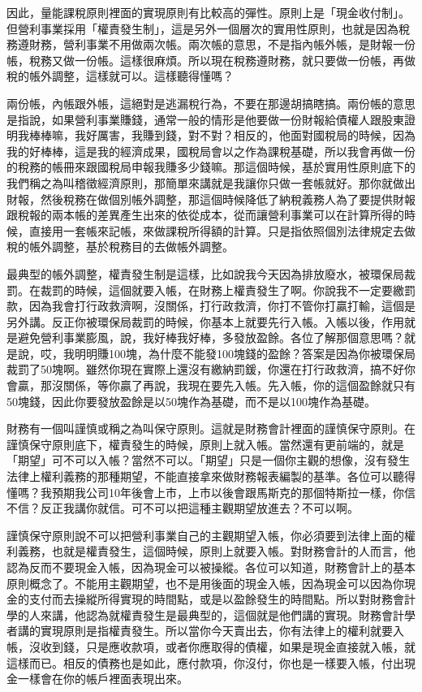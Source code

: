 \documentclass[oneside,sub3section]{ctexbook}
\begin{document}
因此，量能課稅原則裡面的實現原則有比較高的彈性。原則上是「現金收付制」。但營利事業採用「權責發生制」，這是另外一個層次的實用性原則，也就是因為稅務遵財務，營利事業不用做兩次帳。兩次帳的意思，不是指內帳外帳，是財報一份帳，稅務又做一份帳。這樣很麻煩。所以現在稅務遵財務，就只要做一份帳，再做稅的帳外調整，這樣就可以。這樣聽得懂嗎？

兩份帳，內帳跟外帳，這絕對是逃漏稅行為，不要在那邊胡搞瞎搞。兩份帳的意思是指說，如果營利事業賺錢，通常一般的情形是他要做一份財報給債權人跟股東證明我棒棒嘛，我好厲害，我賺到錢，對不對？相反的，他面對國稅局的時候，因為我的好棒棒，這是我的經濟成果，國稅局會以之作為課稅基礎，所以我會再做一份的稅務的帳冊來跟國稅局申報我賺多少錢嘛。那這個時候，基於實用性原則底下的我們稱之為叫稽徵經濟原則，那簡單來講就是我讓你只做一套帳就好。那你就做出財報，然後稅務在做個別帳外調整，那這個時候降低了納稅義務人為了要提供財報跟稅報的兩本帳的差異產生出來的依從成本，從而讓營利事業可以在計算所得的時候，直接用一套帳來記帳，來做課稅所得額的計算。只是指依照個別法律規定去做稅的帳外調整，基於稅務目的去做帳外調整。

最典型的帳外調整，權責發生制是這樣，比如說我今天因為排放廢水，被環保局裁罰。在裁罰的時候，這個就要入帳，在財務上權責發生了啊。你說我不一定要繳罰款，因為我會打行政救濟啊，沒關係，打行政救濟，你打不管你打贏打輸，這個是另外講。反正你被環保局裁罰的時候，你基本上就要先行入帳。入帳以後，作用就是避免營利事業膨風，說，我好棒我好棒，多發放盈餘。各位了解那個意思嗎？就是說，哎，我明明賺100塊，為什麼不能發100塊錢的盈餘？答案是因為你被環保局裁罰了50塊啊。雖然你現在實際上還沒有繳納罰鍰，你還在打行政救濟，搞不好你會贏，那沒關係，等你贏了再說，我現在要先入帳。先入帳，你的這個盈餘就只有50塊錢，因此你要發放盈餘是以50塊作為基礎，而不是以100塊作為基礎。

財務有一個叫謹慎或稱之為叫保守原則。這就是財務會計裡面的謹慎保守原則。在謹慎保守原則底下，權責發生的時候，原則上就入帳。當然還有更前端的，就是「期望」可不可以入帳？當然不可以。「期望」只是一個你主觀的想像，沒有發生法律上權利義務的那種期望，不能直接拿來做財務報表編製的基準。各位可以聽得懂嗎？我預期我公司10年後會上市，上市以後會跟馬斯克的那個特斯拉一樣，你信不信？反正我講你就信。可不可以把這種主觀期望放進去？不可以啊。

謹慎保守原則說不可以把營利事業自己的主觀期望入帳，你必須要到法律上面的權利義務，也就是權責發生，這個時候，原則上就要入帳。對財務會計的人而言，他認為反而不要現金入帳，因為現金可以被操縱。各位可以知道，財務會計上的基本原則概念了。不能用主觀期望，也不是用後面的現金入帳，因為現金可以因為你現金的支付而去操縱所得實現的時間點，或是以盈餘發生的時間點。所以對財務會計學的人來講，他認為就權責發生是最典型的，這個就是他們講的實現。財務會計學者講的實現原則是指權責發生。所以當你今天賣出去，你有法律上的權利就要入帳，沒收到錢，只是應收款項，或者你應取得的債權，如果是現金直接就入帳，就這樣而已。相反的債務也是如此，應付款項，你沒付，你也是一樣要入帳，付出現金一樣會在你的帳戶裡面表現出來。
\end{document}
